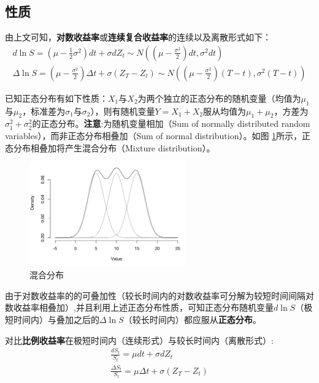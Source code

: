 \documentclass[11pt]{article}
\begin{document}
\subsection{性质}

由上文可知，\textbf{对数收益率}或\textbf{连续复合收益率}的连续以及离散形式如下：
\begin{gather*}
    d\ln S = \left( \mu - \frac{1}{2}\sigma^2\right) dt + \sigma dZ_t \sim N \left( (\mu-\frac{\sigma^2}{2})dt, \sigma^2 dt \right) \\
    \Delta \ln S = \left( \mu - \frac{\sigma^2}{2} \right) \Delta t + \sigma (Z_T - Z_t) \sim N \left((\mu-\frac{\sigma^2}{2})(T-t), \sigma^2(T-t) \right) 
\end{gather*}

已知正态分布有如下性质：$X_1$与$X_2$为两个独立的正态分布的随机变量（均值为$\mu_1$与$\mu_2$，标准差为$\sigma_1$与$\sigma_2$），则有随机变量$Y=X_1+X_2$服从均值为$\mu_1+\mu_2$，方差为$\sigma_1^2+\sigma_2^2$的正态分布。\textbf{注意}:为随机变量相加（Sum of normally distributed random variables），而非正态分布相叠加（Sum of normal distribution）。如图
\ref{fig:mix-dist}所示，正态分布相叠加将产生混合分布（Mixture distribution）。
\begin{figure}[H]
    \centering
    \includegraphics[width=0.6\textwidth]{fig/gaussian-mixture-distribution.png}
    \caption{混合分布}
    \label{fig:mix-dist}
\end{figure}

由于对数收益率的的可叠加性（较长时间内的对数收益率可分解为较短时间间隔对数收益率相叠加）,并且利用上述正态分布性质，可知正态分布随机变量$d\ln S$（极短时间内）与叠加之后的$\Delta \ln S$（较长时间内）都应服从\textbf{正态分布}。

对比\textbf{比例收益率}在极短时间内（连续形式）与较长时间内（离散形式）:
\begin{gather*}
    \frac{dS_t}{S_t} = \mu dt + \sigma dZ_t \\
    \frac{\Delta S_t}{S_t} = \mu \Delta t + \sigma(Z_T - Z_t)
\end{gather*}
\end{document}
